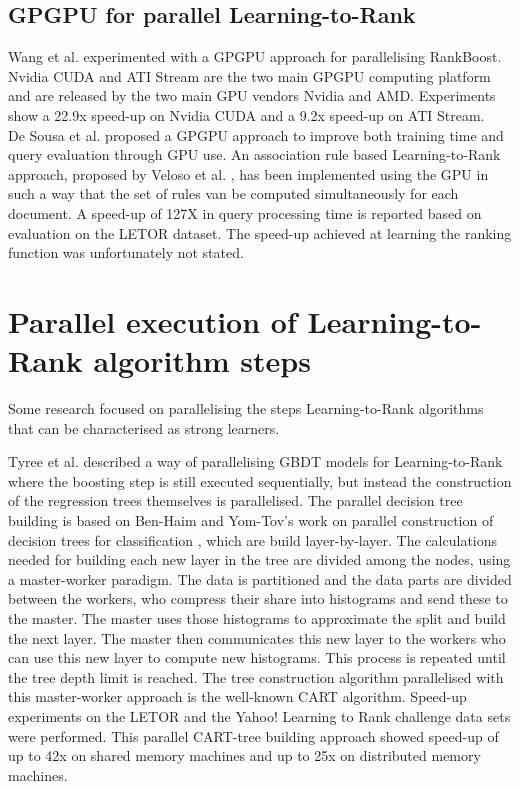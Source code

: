 \subsection{GPGPU for parallel Learning-to-Rank}
Wang et al. \cite{Wang2009} experimented with a \ac{GPGPU} approach for parallelising RankBoost. Nvidia \ac{CUDA} and ATI Stream are the two main \ac{GPGPU} computing platform and are released by the two main \ac{GPU} vendors Nvidia and AMD. Experiments show a 22.9x speed-up on Nvidia \ac{CUDA} and a 9.2x speed-up on ATI Stream.\\

De Sousa et al. \cite{DeSousa2012} proposed a \ac{GPGPU} approach to improve both training time and query evaluation through \ac{GPU} use. An association rule based Learning-to-Rank approach, proposed by Veloso et al. \cite{Veloso2008}, has been implemented using the \ac{GPU} in such a way that the set of rules van be computed simultaneously for each document. A speed-up of 127X in query processing time is reported based on evaluation on the LETOR dataset. The speed-up achieved at learning the ranking function was unfortunately not stated.\\

\section{Parallel execution of Learning-to-Rank algorithm steps}
Some research focused on parallelising the steps Learning-to-Rank algorithms that can be characterised as strong learners.

Tyree et al. \cite{Tyree2011} described a way of parallelising \ac{GBDT} models for Learning-to-Rank where the boosting step is still executed sequentially, but instead the construction of the regression trees themselves is parallelised. The parallel decision tree building is based on Ben-Haim and Yom-Tov's work on parallel construction of decision trees for classification \cite{Ben-Haim2010}, which are build layer-by-layer. The calculations needed for building each new layer in the tree are divided among the nodes, using a master-worker paradigm. The data is partitioned and the data parts are divided between the workers, who compress their share into histograms and send these to the master. The master uses those histograms to approximate the split and build the next layer. The master then communicates this new layer to the workers who can use this new layer to compute new histograms. This process is repeated until the tree depth limit is reached. The tree construction algorithm parallelised with this master-worker approach is the well-known \ac{CART} \cite{Breiman1984} algorithm. Speed-up experiments on the LETOR and the Yahoo! Learning to Rank challenge data sets were performed. This parallel \ac{CART}-tree building approach showed speed-up of up to 42x on shared memory machines and up to 25x on distributed memory machines.\\

